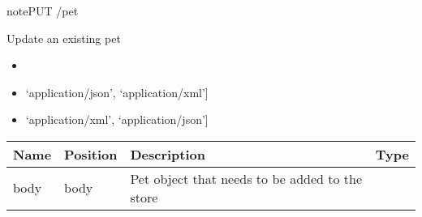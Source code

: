 \documentclass[letterpaper,10pt,english]{sphinxmanual}
\begin{document}
\begin{sphinxadmonition}{note}{PUT /pet}

Update an existing pet\begin{itemize}
\item {} 

\item {} 
\sphinxstylestrong{Consumes: 
}{[}‘application/json’, ‘application/xml’{]}

\item {} 
\sphinxstylestrong{Produces: 
}{[}‘application/xml’, ‘application/json’{]}

\end{itemize}




\begin{savenotes}\sphinxattablestart
\centering
\begin{tabulary}{\linewidth}[t]{|T|T|T|T|}
\hline
\sphinxstyletheadfamily 
Name
&\sphinxstyletheadfamily 
Position
&\sphinxstyletheadfamily 
Description
&\sphinxstyletheadfamily 
Type
\\
\hline
body
&
body
&
Pet object that needs to be added to the store
&

\\
\hline
\end{tabulary}
\par
\sphinxattableend\end{savenotes}




\end{sphinxadmonition}
\end{document}
